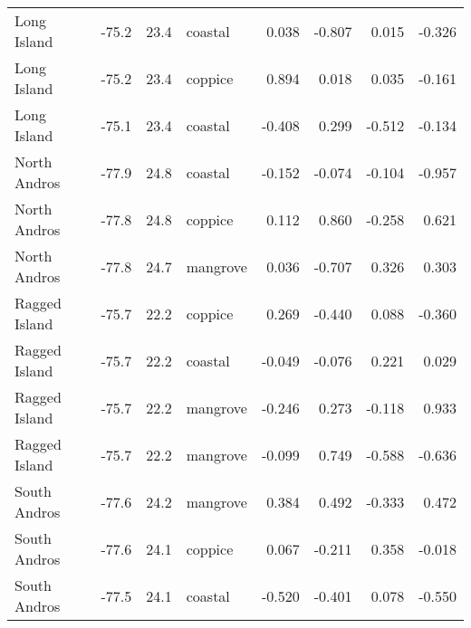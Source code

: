 \begin{tabular}{lrrlrrrr}
Long Island & -75.2 & 23.4 & coastal & 0.038 & -0.807 & 0.015 & -0.326\\
Long Island & -75.2 & 23.4 & coppice & 0.894 & 0.018 & 0.035 & -0.161\\
Long Island & -75.1 & 23.4 & coastal & -0.408 & 0.299 & -0.512 & -0.134\\
North Andros & -77.9 & 24.8 & coastal & -0.152 & -0.074 & -0.104 & -0.957\\
North Andros & -77.8 & 24.8 & coppice & 0.112 & 0.860 & -0.258 & 0.621\\
North Andros & -77.8 & 24.7 & mangrove & 0.036 & -0.707 & 0.326 & 0.303\\
Ragged Island & -75.7 & 22.2 & coppice & 0.269 & -0.440 & 0.088 & -0.360\\
Ragged Island & -75.7 & 22.2 & coastal & -0.049 & -0.076 & 0.221 & 0.029\\
Ragged Island & -75.7 & 22.2 & mangrove & -0.246 & 0.273 & -0.118 & 0.933\\
Ragged Island & -75.7 & 22.2 & mangrove & -0.099 & 0.749 & -0.588 & -0.636\\
South Andros & -77.6 & 24.2 & mangrove & 0.384 & 0.492 & -0.333 & 0.472\\
South Andros & -77.6 & 24.1 & coppice & 0.067 & -0.211 & 0.358 & -0.018\\
South Andros & -77.5 & 24.1 & coastal & -0.520 & -0.401 & 0.078 & -0.550\\
\bottomrule
\end{tabular}